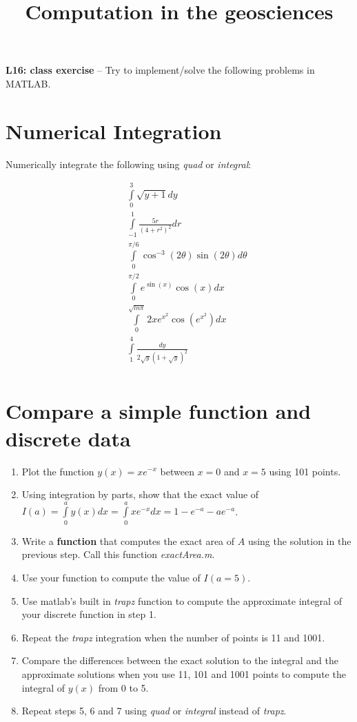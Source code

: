 \documentclass[10pt,fleqn]{article}
\title{Computation in the geosciences}
\date{\empty}
\begin{document}
\textbf{L16: class exercise} -- Try to implement/solve the following problems in MATLAB.


\section*{Numerical Integration}

Numerically integrate the following using \textit{quad} or \textit{integral}:

\begin{eqnarray} \nonumber
&& \int\limits_0^{3} \sqrt{y+1} dy \\ \nonumber
&& \int\limits_{-1}^{1} \frac{5r}{(4+r^2)^2} dr  \\ \nonumber
&& \int\limits_0^{\pi/6} \cos^{-3}(2\theta) \sin(2\theta) d\theta \\ \nonumber
&& \int\limits_0^{\pi/2} e^{\sin(x)}\cos(x) dx \\ \nonumber
&& \int\limits_0^{\sqrt{ln\pi}} 2xe^{x^2}\cos(e^{x^2}) dx  \\ \nonumber
&& \int\limits_1^{4} \frac{dy}{2\sqrt{y}(1+\sqrt{y})^2}  \\ \nonumber
\end{eqnarray}

\section*{Compare a simple function and discrete data}

\begin{enumerate}
	\item Plot the function $y(x)=xe^{-x}$ between $x=0$ and $x=5$ using 101 points.
	\item Using integration by parts, show that the exact value of $I(a) = \int\limits_0^a y(x) dx = \int \limits_0^a xe^{-x} dx = 1-e^{-a} - ae^{-a}$.
	\item Write a \textbf{function} that computes the exact area of $A$ using the solution in the previous step. Call this function \textit{exactArea.m}.
	\item Use your function to compute the value of $I(a=5)$.
	\item Use matlab's built in \textit{trapz} function to compute the approximate integral of your discrete function in step 1.
	\item Repeat the \textit{trapz} integration when the number of points is 11 and 1001. 
	\item Compare the differences between the exact solution to the integral and the approximate solutions when you use 11, 101 and 1001 points to compute the integral of $y(x)$ from 0 to 5.
	\item Repeat steps 5, 6 and 7 using \textit{quad} or \textit{integral} instead of \textit{trapz}.
\end{enumerate}
\end{document}
